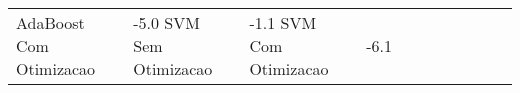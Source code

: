 \begin{table}[H]
\begin{adjustwidth}{ -1in }{ -1in }
\begin{tabular}{lllllllllll}
           AdaBoost Com Otimizacao &      -5.0%
                SVM Sem Otimizacao &      -1.1%
                SVM Com Otimizacao &      -6.1%
\bottomrule
\end{tabular}
    \end{adjustwidth}
    \renewcommand{\arraystretch}{1.0} %
\end{table}
